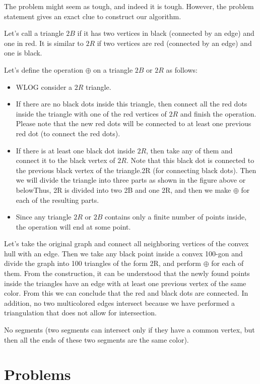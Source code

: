 \sol The problem might seem as tough, and indeed it is tough. However, the problem statement gives an exact clue to construct our algorithm.

Let's call a triangle $2B$ if it has two vertices in black (connected by an edge) and one in red. It is similar to $2R$ if two vertices are red (connected by an edge) and one is black.

Let's define the operation $\oplus $ on a triangle $2B$ or $2R$ as follows:

\begin{itemize}
    \item WLOG consider a $2R$ triangle.
    \item If there are no black dots inside this triangle, then connect all the red dots inside the triangle with one of the red vertices of $2R$ and finish the operation. Please note that the new red dots will be connected to at least one previous red dot (to connect the red dots).
    \item If there is at least one black dot inside $2R$, then take any of them and connect it to the black vertex of $2R$. Note that this black dot is connected to the previous black vertex of the triangle.2R (for connecting black dots). Then we will divide the triangle into three parts as shown in the figure above or belowThus, 2R is divided into two 2B and one 2R, and then we make $\oplus $ for each of the resulting parts.
    \item Since any triangle $2R$ or $2B$ contains only a finite number of points inside, the operation will end at some point.
\end{itemize}

Let's take the original graph and connect all neighboring vertices of the convex hull with an edge. Then we take any black point inside a convex 100-gon and divide the graph into 100 triangles of the form 2R, and perform $\oplus $ for each of them. From the construction, it can be understood that the newly found points inside the triangles have an edge with at least one previous vertex of the same color. From this we can conclude that the red and black dots are connected. In addition, no two multicolored edges intersect because we have performed a triangulation that does not allow for intersection.

No segments (two segments can intersect only if they have a common vertex, but then all the ends of these two segments are the same color).

\newpage

\section{Problems}

